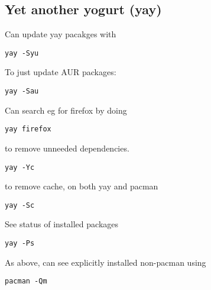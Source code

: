 
\subsection{Yet another yogurt (yay)}

Can update yay pacakges with 

\begin{verbatim}
yay -Syu
\end{verbatim}

To just update AUR packages:

\begin{verbatim}
yay -Sau
\end{verbatim}

Can search eg for firefox by doing 

\begin{verbatim}
yay firefox
\end{verbatim}

to remove unneeded dependencies.
\begin{verbatim}
yay -Yc
\end{verbatim}

to remove cache, on both yay and pacman
\begin{verbatim}
yay -Sc
\end{verbatim}

See status of installed packages

\begin{verbatim}
yay -Ps
\end{verbatim}

As above, can see explicitly installed non-pacman using
\begin{verbatim}
pacman -Qm
\end{verbatim}

